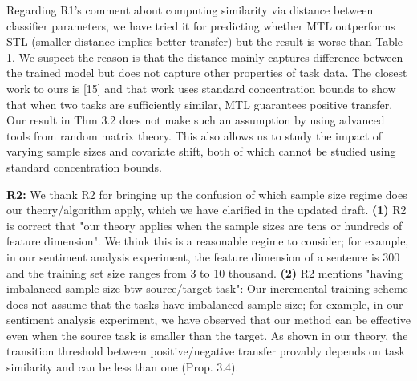 \documentclass{article}
\begin{document}
Regarding R1's comment about computing similarity via distance between classifier parameters, we have tried it for predicting whether MTL outperforms STL (smaller distance implies better transfer) but the result is worse than Table 1.
We suspect the reason is that the distance mainly captures difference between the trained model but does not capture other properties of task data.
%
The closest work to ours is [15] and that work uses standard concentration bounds to show that when two tasks are sufficiently similar, MTL guarantees positive transfer.
Our result in Thm 3.2 does not make such an assumption by using advanced tools from random matrix theory.
This also allows us to study the impact of varying sample sizes and covariate shift, both of which cannot be studied using standard concentration bounds.

\textbf{R2:}
We thank R2 for bringing up the confusion of which sample size regime does our theory/algorithm apply, which we have clarified in the updated draft.
\textbf{(1)} R2 is correct that "our theory applies when the sample sizes are tens or hundreds of feature dimension".
We think this is a reasonable regime to consider; for example, in our sentiment analysis experiment, the feature dimension of a sentence is 300 and the training set size ranges from 3 to 10 thousand.
\textbf{(2)} R2 mentions "having imbalanced sample size btw source/target task": Our incremental training scheme does not assume that the tasks have imbalanced sample size; for example, in our sentiment analysis experiment, we have observed that our method can be effective even when the source task is smaller than the target.
As shown in our theory, the transition threshold between positive/negative transfer provably depends on task similarity and can be less than one (Prop. 3.4).
\end{document}
